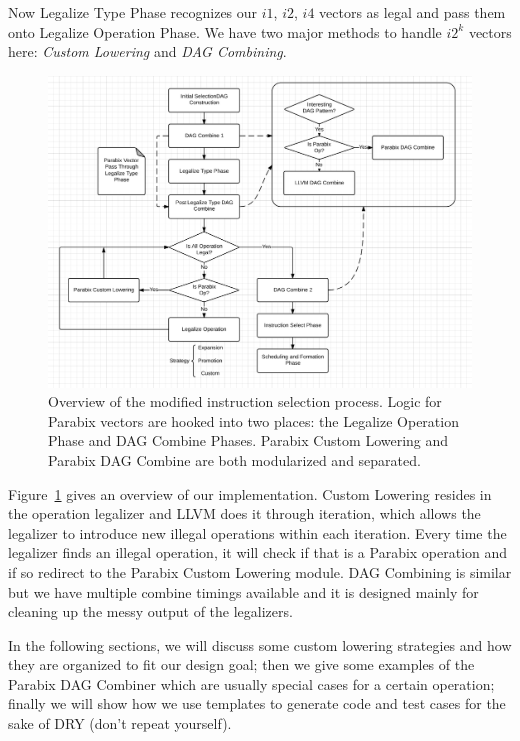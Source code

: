Now Legalize Type Phase recognizes our $i1$, $i2$, $i4$ vectors as legal and pass them onto Legalize Operation Phase. We have two major methods to handle $i2^k$ vectors here: \textit{Custom Lowering} and \textit{DAG Combining}.

\begin{figure}[ht!]
\centering
\includegraphics[width=140mm]{draw/system.png}
\caption[System overview: modified instruction selection process]{Overview of the modified instruction selection process. Logic for Parabix vectors are hooked into two places: the Legalize Operation Phase and DAG Combine Phases. Parabix Custom Lowering and Parabix DAG Combine are both modularized and separated.}
\label{figure:system}
\end{figure}

Figure~\ref{figure:system} gives an overview of our implementation. Custom Lowering resides in the operation legalizer and LLVM does it through iteration, which allows the legalizer to introduce new illegal operations within each iteration. Every time the legalizer finds an illegal operation, it will check if that is a Parabix operation and if so redirect to the Parabix Custom Lowering module. DAG Combining is similar but we have multiple combine timings available and it is designed mainly for cleaning up the messy output of the legalizers.

In the following sections, we will discuss some custom lowering strategies and how they are organized to fit our design goal; then we give some examples of the Parabix DAG Combiner which are usually special cases for a certain operation; finally we will show how we use templates to generate code and test cases for the sake of DRY (don't repeat yourself).

